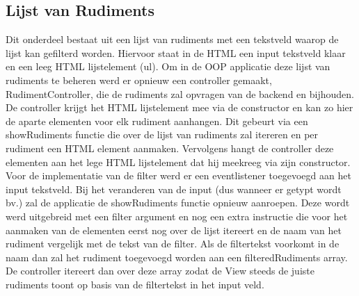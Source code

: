  \subsection{Lijst van Rudiments}
 Dit onderdeel bestaat uit een lijst van rudiments met een tekstveld waarop de lijst kan gefilterd worden. Hiervoor staat in de HTML een input tekstveld klaar en een leeg HTML lijstelement (ul). Om in de OOP applicatie deze lijst van rudiments te beheren werd er opnieuw een controller gemaakt, RudimentController, die de rudiments zal opvragen van de backend en bijhouden. De controller krijgt het HTML lijstelement mee via de constructor en kan zo hier de aparte elementen voor elk rudiment aanhangen. Dit gebeurt via een showRudiments functie die over de lijst van rudiments zal itereren en per rudiment een HTML element aanmaken. Vervolgens hangt de controller deze elementen aan het lege HTML lijstelement dat hij meekreeg via zijn constructor. Voor de implementatie van de filter werd er een eventlistener toegevoegd aan het input tekstveld. Bij het veranderen van de input (dus wanneer er getypt wordt bv.) zal de applicatie de showRudiments functie opnieuw aanroepen. Deze wordt werd uitgebreid met een filter argument en nog een extra instructie die voor het aanmaken van de elementen eerst nog over de lijst itereert en de naam van het rudiment vergelijk met de tekst van de filter. Als de filtertekst voorkomt in de naam dan zal het rudiment toegevoegd worden aan een filteredRudiments array. De controller itereert dan over deze array zodat de View steeds de juiste rudiments toont op basis van de filtertekst in het input veld.

